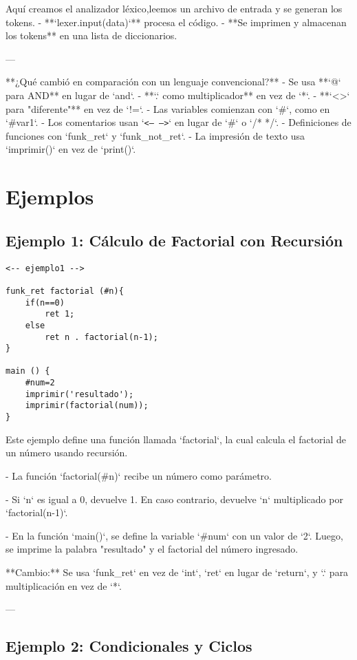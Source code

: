 \documentclass{article}
\begin{document}
Aquí creamos el analizador léxico,leemos un archivo de entrada y se generan los tokens.  
- **`lexer.input(data)`** procesa el código.  
- **Se imprimen y almacenan los tokens** en una lista de diccionarios.  

---

**¿Qué cambió en comparación con un lenguaje convencional?**  
- Se usa **`@` para AND** en lugar de `and`.  
- **`.` como multiplicador** en vez de `*`.  
- **`\textless{}\textgreater{}` para "diferente"** en vez de `!=`.  
- Las variables comienzan con `\#`, como en `\#var1`.  
- Los comentarios usan `\texttt{\textless{}-- --\textgreater{}}` en lugar de `#` o `/* */`.  
- Definiciones de funciones con `funk_ret` y `funk_not_ret`.  
- La impresión de texto usa `imprimir()` en vez de `print()`.  


\section{Ejemplos}

\subsection{Ejemplo 1: Cálculo de Factorial con Recursión}

\begin{verbatim}
<-- ejemplo1 -->

funk_ret factorial (#n){
    if(n==0)
        ret 1;
    else
        ret n . factorial(n-1);
}

main () {
    #num=2
    imprimir('resultado');
    imprimir(factorial(num));
}
\end{verbatim}

Este ejemplo define una función llamada `factorial`, la cual calcula el factorial de un número usando recursión.  

- La función `factorial(#n)` recibe un número como parámetro.  

- Si `n` es igual a 0, devuelve 1. En caso contrario, devuelve `n` multiplicado por `factorial(n-1)`.  

- En la función `main()`, se define la variable `#num` con un valor de `2`. Luego, se imprime la palabra "resultado" y el factorial del número ingresado.  

**Cambio:** Se usa `funk_ret` en vez de `int`, `ret` en lugar de `return`, y `.` para multiplicación en vez de `*`.  

---

\subsection{Ejemplo 2: Condicionales y Ciclos}
\end{document}
